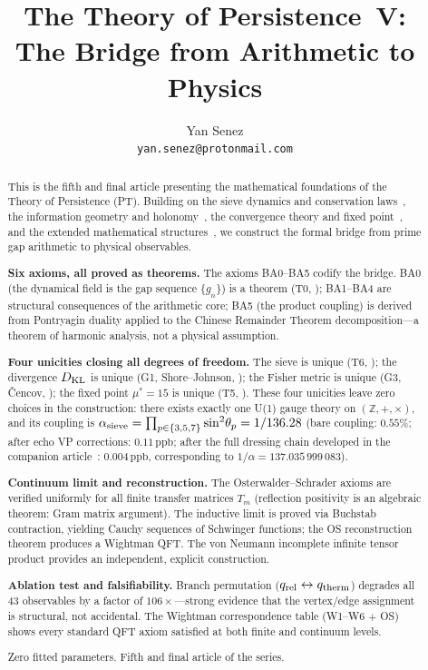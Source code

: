 \documentclass[12pt,a4paper]{article}
\title{\textbf{The Theory of Persistence~V:\\The Bridge from Arithmetic to Physics}}
\author{Yan Senez\\\texttt{yan.senez@protonmail.com}}
\date{}
\begin{document}
\maketitle

\begin{abstract}
This is the fifth and final article presenting the mathematical
foundations of the Theory of Persistence (PT).  Building on the sieve
dynamics and conservation laws~\cite{companion_M1}, the information
geometry and holonomy~\cite{companion_M2}, the convergence theory and
fixed point~\cite{companion_M3}, and the extended mathematical
structures~\cite{companion_M4}, we construct the formal bridge from
prime gap arithmetic to physical observables.

\textbf{Six axioms, all proved as theorems.}
The axioms BA0--BA5 codify the bridge.  BA0 (the dynamical field is
the gap sequence $\{g_n\}$) is a theorem (T0,
\cite{companion_M3}); BA1--BA4 are structural consequences of the
arithmetic core; BA5 (the product coupling) is derived from Pontryagin
duality applied to the Chinese Remainder Theorem decomposition---a
theorem of harmonic analysis, not a physical assumption.

\textbf{Four unicities closing all degrees of freedom.}
The sieve is unique (T6, \cite{companion_M2}); the divergence $D_{\rm KL}$
is unique (G1, Shore--Johnson, \cite{companion_M2}); the Fisher metric is
unique (G3, \v{C}encov, \cite{companion_M2}); the fixed point
$\mu^* = 15$ is unique (T5, \cite{companion_M3}).  These four unicities
leave zero choices in the construction: there exists exactly one U(1) gauge
theory on $(\mathbb{Z}, +, \times)$, and its coupling is
$\alpha_{\rm sieve} = \prod_{p \in \{3,5,7\}} \sin^2\!\theta_p = 1/136.28$
(bare coupling: $0.55\%$; after echo VP corrections:
$0.11\,\mathrm{ppb}$; after the full dressing chain developed in
the companion article~\cite{companion_physics}: $0.004\,\mathrm{ppb}$,
corresponding to $1/\alpha = 137.035\,999\,083$).

\textbf{Continuum limit and reconstruction.}
The Osterwalder--Schrader axioms are verified uniformly for all finite
transfer matrices $T_m$ (reflection positivity is an algebraic theorem:
Gram matrix argument).  The inductive limit is proved via Buchstab
contraction, yielding Cauchy sequences of Schwinger functions; the
OS reconstruction theorem produces a Wightman QFT.  The von Neumann
incomplete infinite tensor product provides an independent, explicit
construction.

\textbf{Ablation test and falsifiability.}
Branch permutation ($q_{\rm rel} \leftrightarrow q_{\rm therm}$)
degrades all 43 observables by a factor of $106\times$---strong evidence
that the vertex/edge assignment is structural, not accidental.  The
Wightman correspondence table (W1--W6 + OS) shows every standard QFT
axiom satisfied at both finite and continuum levels.

Zero fitted parameters.  Fifth and final article of the series.
\end{abstract}
\end{document}
